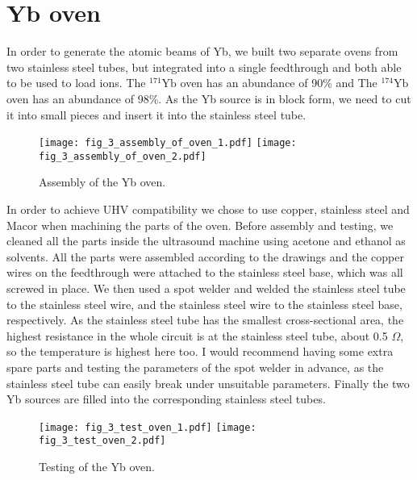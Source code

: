 \section{Yb oven}

In order to generate the atomic beams of Yb, we built two separate ovens from two stainless steel tubes, but integrated into a single feedthrough and both able to be used to load ions. The ${ }^{171} \mathrm{Yb}$ oven has an abundance of 90\% and The ${ }^{174} \mathrm{Yb}$ oven has an abundance of 98\%. As the Yb source is in block form, we need to cut it into small pieces and insert it into the stainless steel tube.

\begin{figure}
    \centering
    {\texttt{[image: fig\_3\_assembly\_of\_oven\_1.pdf]}}
    {\texttt{[image: fig\_3\_assembly\_of\_oven\_2.pdf]}}
    \caption{Assembly of the Yb oven.}
\end{figure}

In order to achieve UHV compatibility we chose to use copper, stainless steel and Macor when machining the parts of the oven. Before assembly and testing, we cleaned all the parts inside the ultrasound machine using acetone and ethanol as solvents. All the parts were assembled according to the drawings and the copper wires on the feedthrough were attached to the stainless steel base, which was all screwed in place. We then used a spot welder and welded the stainless steel tube to the stainless steel wire, and the stainless steel wire to the stainless steel base, respectively. As the stainless steel tube has the smallest cross-sectional area, the highest resistance in the whole circuit is at the stainless steel tube, about 0.5 $\Omega$, so the temperature is highest here too. I would recommend having some extra spare parts and testing the parameters of the spot welder in advance, as the stainless steel tube can easily break under unsuitable parameters. Finally the two Yb sources are filled into the corresponding stainless steel tubes.

\begin{figure}
    \centering
    {\texttt{[image: fig\_3\_test\_oven\_1.pdf]}}
    {\texttt{[image: fig\_3\_test\_oven\_2.pdf]}}
    \caption{Testing of the Yb oven.}
\end{figure}

